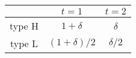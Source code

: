 \documentclass[]{standalone}
\begin{document}
\begin{tabular}{c| c| c}
 & $t=1$ & $t=2$ \\
 \hline
 type H & $1+\delta$ & $\delta $ \\
 \hline
type L & $(1+\delta)/2$ & $\delta/2$
\end{tabular}
\end{document}

